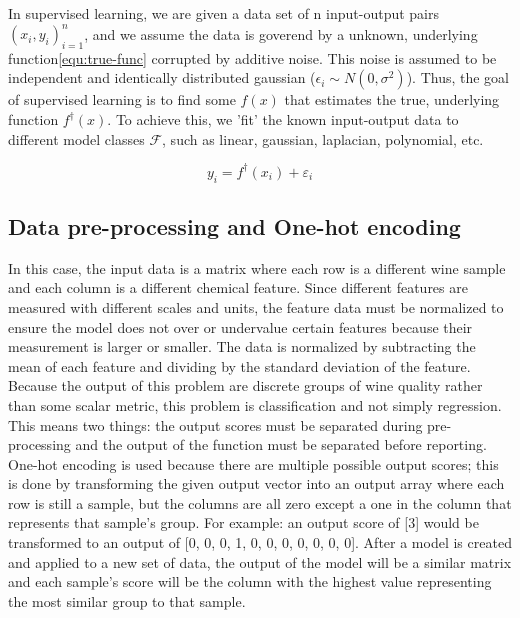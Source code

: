 \documentclass[11pt]{amsart}
\begin{document}
In supervised learning, we are given a data set of n input-output pairs ${(x_i,y_i)}_{i=1}^n$, and we assume the data 
is goverend by a unknown, underlying function\eqref{equ:true-func} corrupted by additive noise. This noise is assumed to be independent and 
identically distributed gaussian ($\epsilon_i \sim N(0, \sigma^2)$). Thus, the goal of supervised learning is to find 
some $\hat{f}(x)$ that estimates the true, underlying function $f^\dagger(x)$. To achieve this, we 'fit' the known input-output 
data to different model classes $\mathcal{F}$, such as linear, gaussian, laplacian, polynomial, etc.

\begin{equation}
    y_i = f^\dagger(x_i) + \varepsilon_i
    \label{equ:true-func}
\end{equation}

\subsection{Data pre-processing and One-hot encoding}\label{sec:One-hot-encoding}

In this case, the input data is a matrix where each row is a different wine sample and each column is a different chemical feature. 
Since different features are measured with different scales and units, the feature data must be normalized to ensure the model does not 
over or undervalue certain features because their measurement is larger or smaller. The data is normalized by subtracting the mean 
of each feature and dividing by the standard deviation of the feature. Because the output of this problem are discrete groups of wine quality 
rather than some scalar metric, this problem is classification and not simply regression. This means two things: the output scores must 
be separated during pre-processing and the output of the function must be separated before reporting. One-hot encoding is used because there 
are multiple possible output scores; this is done by transforming the given output vector into an output array where each row is still a sample, but 
the columns are all zero except a one in the column that represents that sample's group. For example: an output score of [3] would be transformed 
to an output of [0, 0, 0, 1, 0, 0, 0, 0, 0, 0, 0]. After a model is created and applied to a new set of data, the output of the model will be a 
similar matrix and each sample's score will be the column with the highest value representing the most similar group to that sample.\\
\end{document}
